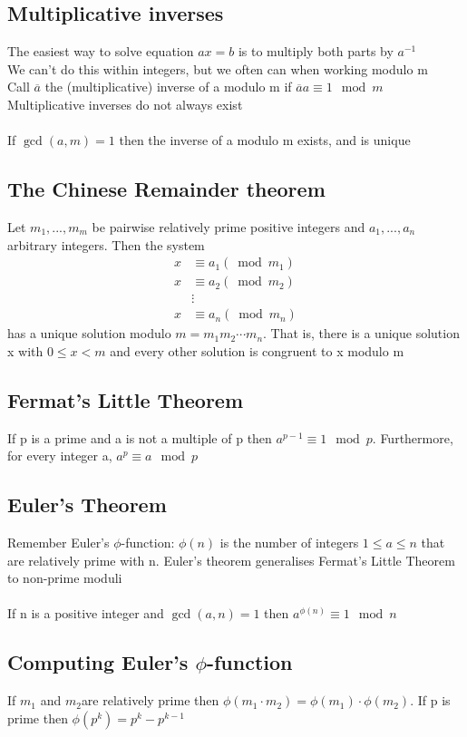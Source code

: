 \documentclass{article}[18pt]
\begin{document}
\subsection{Multiplicative inverses}
The easiest way to solve equation $ax=b$ is to multiply both parts by $a^{-1}$\\
We can't do this within integers, but we often can when working modulo m\\
Call $\overline{a}$ the (multiplicative) inverse of a modulo m if $\overline{a}a\equiv1\mod m$\\
Multiplicative inverses do not always exist\\
\\
If $\gcd(a,m)=1$ then the inverse of a modulo m exists, and is unique
\subsection{The Chinese Remainder theorem}
Let $m_1,...,m_m$ be pairwise relatively prime positive integers and $a_1,...,a_n$ arbitrary integers. Then the system
\[
\begin{aligned} x & \equiv a_{1}\left(\bmod m_{1}\right) \\ x & \equiv a_{2}\left(\bmod m_{2}\right) \\ & \vdots \\ x & \equiv a_{n}\left(\bmod m_{n}\right) \end{aligned}
\]
has a unique solution modulo $m=m_1m_2\cdots m_n$. That is, there is a unique solution x with $0\leqslant x<m$ and every other solution is congruent to x modulo m
\subsection{Fermat's Little Theorem}
If p is a prime and a is not a multiple of p then $a^{p-1}\equiv 1\mod p$. Furthermore, for every integer a, $a^p\equiv a\mod p$
\subsection{Euler's Theorem}
Remember Euler's $\phi$-function: $\phi(n)$ is the number of integers $1\leqslant a \leqslant n$ that are relatively prime with n. Euler's theorem generalises Fermat's Little Theorem to non-prime moduli\\
\\
If n is a positive integer and $\gcd(a,n)=1$ then $a^{\phi(n)}\equiv 1\mod n$
\subsection{Computing Euler's $\phi$-function}
If $m_1$ and $m_2$are relatively prime then $\phi(m_1\cdot m_2)=\phi(m_1)\cdot \phi(m_2)$. If p is prime then $\phi(p^k)=p^k-p^{k-1}$
\end{document}
